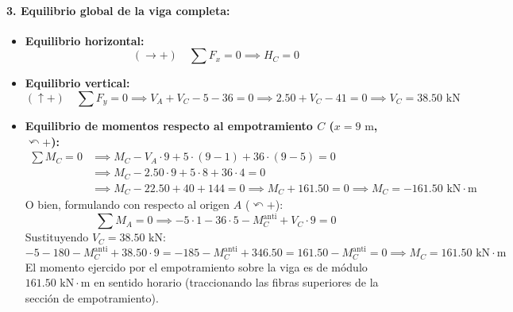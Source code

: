\paragraph{3. Equilibrio global de la viga completa:}
\begin{itemize}
    \item \textbf{Equilibrio horizontal:}
    \begin{equation}
        (\rightarrow +) \quad \sum F_x = 0 \implies \boxed{H_C = 0}
    \end{equation}
    \item \textbf{Equilibrio vertical:}
    \begin{equation}
        (\uparrow +) \quad \sum F_y = 0 \implies V_A + V_C - 5 - 36 = 0 \implies 2.50 + V_C - 41 = 0 \implies \boxed{V_C = 38.50\text{ kN}}
    \end{equation}
    \item \textbf{Equilibrio de momentos respecto al empotramiento $C$ ($x = 9\text{ m}$, $\curvearrowleft +$):}
    \begin{align}
        \sum M_C = 0 &\implies M_C - V_A \cdot 9 + 5 \cdot (9 - 1) + 36 \cdot (9 - 5) = 0 \nonumber \\
        &\implies M_C - 2.50 \cdot 9 + 5 \cdot 8 + 36 \cdot 4 = 0 \nonumber \\
        &\implies M_C - 22.50 + 40 + 144 = 0 \implies M_C + 161.50 = 0 \implies \boxed{M_C = -161.50\text{ kN}\cdot\text{m}}
    \end{align}
    O bien, formulando con respecto al origen $A$ ($\curvearrowleft +$):
    \begin{equation}
        \sum M_A = 0 \implies -5 \cdot 1 - 36 \cdot 5 - M_C^{\text{anti}} + V_C \cdot 9 = 0
    \end{equation}
    Sustituyendo $V_C = 38.50\text{ kN}$:
    \[
        -5 - 180 - M_C^{\text{anti}} + 38.50 \cdot 9 = -185 - M_C^{\text{anti}} + 346.50 = 161.50 - M_C^{\text{anti}} = 0 \implies \boxed{M_C = 161.50\text{ kN}\cdot\text{m}}
    \]
    El momento ejercido por el empotramiento sobre la viga es de módulo $161.50\text{ kN}\cdot\text{m}$ en sentido horario (traccionando las fibras superiores de la sección de empotramiento).
\end{itemize}

